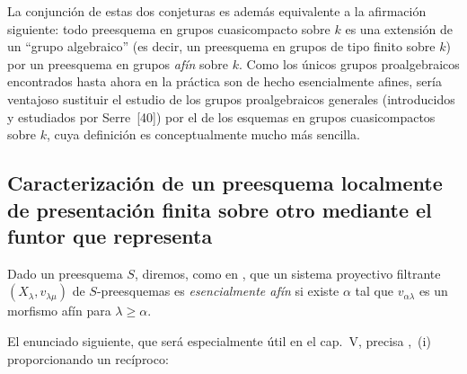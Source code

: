 \begin{remark}[8.13.6]
La conjunción de estas dos conjeturas es además equivalente a la afirmación siguiente: todo preesquema en grupos cuasicompacto sobre $k$ es una extensión de un ``grupo algebraico'' (es decir, un preesquema en grupos de tipo finito sobre $k$) por un preesquema en grupos \emph{afín} sobre $k$.
Como los únicos grupos proalgebraicos encontrados hasta ahora en la práctica son de hecho esencialmente afines, sería ventajoso sustituir el estudio de los grupos proalgebraicos generales (introducidos y estudiados por Serre~[40]) por el de los esquemas en grupos cuasicompactos sobre $k$, cuya definición es conceptualmente mucho más sencilla.
\end{remark}

\subsection{Caracterización de un preesquema localmente de presentación finita sobre otro mediante el funtor que representa}
\label{subsection:IV.8.14-fr}

\begin{env}[8.14.1]
\label{IV.8.14.1-fr}
Dado un preesquema $S$, diremos, como en , que un sistema proyectivo filtrante $(X_\lambda,v_{\lambda\mu})$ de $S$-preesquemas es \emph{esencialmente afín} si existe $\alpha$ tal que $v_{\alpha\lambda}$ es un morfismo afín para $\lambda\geqslant\alpha$.

El enunciado siguiente, que será especialmente útil en el cap.~V, precisa ,~(i) proporcionando un recíproco:
\end{env}

